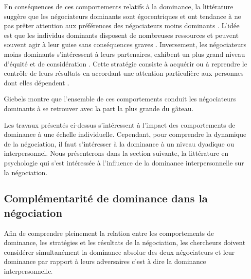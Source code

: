 	En conséquences de ces comportements relatifs à la dominance, la littérature suggère que les négociateurs dominants sont égocentriques et ont tendance à ne pas prêter attention aux préférences des négociateurs moins dominants   \cite{fiske1993controlling, de1995impact}. L'idée est que les individus dominants disposent de nombreuses ressources et peuvent souvent agir à leur guise sans conséquences graves \cite{van2006power}. Inversement, les négociateurs moins dominants s'intéressent à leurs partenaires, exhibent un plus grand niveau d'équité et de considération \cite{de1995impact}. Cette stratégie consiste à acquérir ou à reprendre le contrôle de leurs résultats en accordant une attention particulière aux personnes dont elles dépendent \cite{fiske1993controlling}.
	
	Giebels \cite{giebels2000interdependence} montre que l'ensemble de ces comportements conduit les négociateurs dominants à se retrouver avec la part la plus grande du gâteau.
	
	Les travaux présentés ci-dessus s'intéressent à l'impact des comportements de dominance à une échelle individuelle. Cependant, pour comprendre la dynamique de la négociation, il faut s'intéresser à la dominance à un niveau dyadique ou interpersonnel. 
	Nous présenterons dans la section suivante, la littérature en psychologie qui s'est intéressée à l'influence de la dominance interpersonnelle sur la négociation. 

	\subsection{Complémentarité de dominance dans la négociation}
	Afin de comprendre pleinement la relation entre les comportements de dominance, les stratégies et les résultats de la négociation, les chercheurs doivent considérer simultanément la dominance absolue des deux négociateurs et leur dominance par rapport à leurs adversaires c'est à dire la dominance interpersonnelle. 
	
